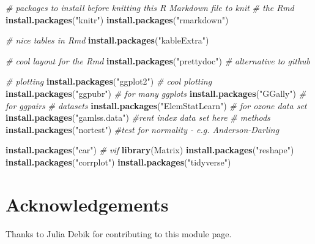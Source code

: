 \documentclass[]{article}
\newenvironment{Shaded}{\begin{snugshade}}{\end{snugshade}}
\newcommand{\CommentTok}[1]{\textcolor[rgb]{0.56,0.35,0.01}{\textit{#1}}}
\newcommand{\KeywordTok}[1]{\textcolor[rgb]{0.13,0.29,0.53}{\textbf{#1}}}
\newcommand{\NormalTok}[1]{#1}
\newcommand{\StringTok}[1]{\textcolor[rgb]{0.31,0.60,0.02}{#1}}
\begin{document}
\begin{Shaded}
\begin{Highlighting}[]
\CommentTok{# packages to install before knitting this R Markdown file to knit}
\CommentTok{# the Rmd}
\KeywordTok{install.packages}\NormalTok{(}\StringTok{"knitr"}\NormalTok{)}
\KeywordTok{install.packages}\NormalTok{(}\StringTok{"rmarkdown"}\NormalTok{)}

\CommentTok{# nice tables in Rmd}
\KeywordTok{install.packages}\NormalTok{(}\StringTok{"kableExtra"}\NormalTok{)}

\CommentTok{# cool layout for the Rmd}
\KeywordTok{install.packages}\NormalTok{(}\StringTok{"prettydoc"}\NormalTok{)  }\CommentTok{# alternative to github}

\CommentTok{# plotting}
\KeywordTok{install.packages}\NormalTok{(}\StringTok{"ggplot2"}\NormalTok{)  }\CommentTok{# cool plotting}
\KeywordTok{install.packages}\NormalTok{(}\StringTok{"ggpubr"}\NormalTok{)  }\CommentTok{# for many ggplots}
\KeywordTok{install.packages}\NormalTok{(}\StringTok{"GGally"}\NormalTok{)  }\CommentTok{# for ggpairs}
\CommentTok{# datasets}
\KeywordTok{install.packages}\NormalTok{(}\StringTok{"ElemStatLearn"}\NormalTok{)  }\CommentTok{# for ozone data set}
\KeywordTok{install.packages}\NormalTok{(}\StringTok{"gamlss.data"}\NormalTok{)  }\CommentTok{#rent index data set here}
\CommentTok{# methods}
\KeywordTok{install.packages}\NormalTok{(}\StringTok{"nortest"}\NormalTok{)  }\CommentTok{#test for normality - e.g. Anderson-Darling}

\KeywordTok{install.packages}\NormalTok{(}\StringTok{"car"}\NormalTok{)  }\CommentTok{# vif}
\KeywordTok{library}\NormalTok{(Matrix)}
\KeywordTok{install.packages}\NormalTok{(}\StringTok{"reshape"}\NormalTok{)}
\KeywordTok{install.packages}\NormalTok{(}\StringTok{"corrplot"}\NormalTok{)}
\KeywordTok{install.packages}\NormalTok{(}\StringTok{"tidyverse"}\NormalTok{)}
\end{Highlighting}
\end{Shaded}

\hypertarget{acknowledgements}{%
\section{Acknowledgements}\label{acknowledgements}}

Thanks to Julia Debik for contributing to this module page.
\end{document}
